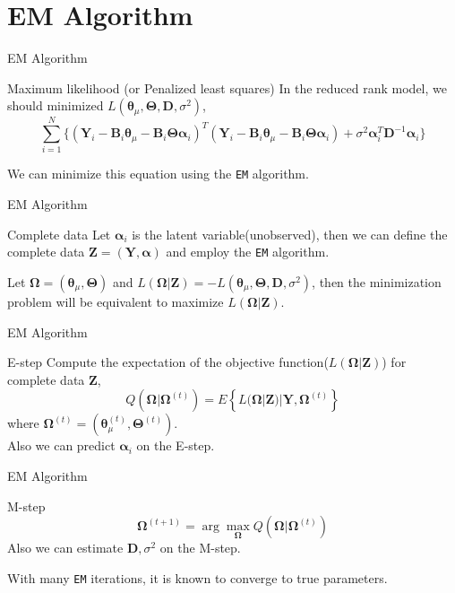 \documentclass{beamer}
\def \bY {\mathbf{Y}}
\def \bD {\mathbf{D}}
\def \btheta {\boldsymbol{\theta}}
\def \bTheta {\boldsymbol{\Theta}}
\def \balpha {\boldsymbol{\alpha}}
\begin{document}
\section{EM Algorithm}
\begin{frame}{EM Algorithm}
	\begin{block}{Maximum likelihood (or Penalized least squares)}
		\vspace{0.5cm}
		In the reduced rank model, we should minimized $L(\btheta_{\mu}, \bTheta, \mathbf{D}, \sigma^2)$,
		$$
		\sum_{i=1}^N \bigg \{ (\bY_i-\mathbf{B}_i\btheta_{\mu}-\mathbf{B}_i\bTheta\balpha_i)^T(\bY_i-\mathbf{B}_i\btheta_{\mu}-\mathbf{B}_i\bTheta\balpha_i) + \sigma^2 \balpha_i^T \bD^{-1}\balpha_i \bigg \}
		$$
	\end{block}
	We can minimize this equation using the \texttt{EM} algorithm.
\end{frame}

\begin{frame}{EM Algorithm}
	\begin{block}{Complete data}
		\vspace{0.2cm}
		Let $\balpha_i$ is the latent variable(unobserved), then we can define the complete data $ \mathbf{Z} = (\bY, \balpha)$ and employ the \texttt{EM} algorithm.
	\end{block}
	\vspace{1cm}
	Let $\mathbf\Omega = (\btheta_{\mu}, \bTheta)$ and $L(\mathbf\Omega|\mathbf{Z}) = -L(\btheta_{\mu}, \bTheta, \mathbf{D}, \sigma^2)$, then the minimization problem will be equivalent to maximize $L(\mathbf\Omega|\mathbf{Z})$.
\end{frame}

\begin{frame}{EM Algorithm}
	\begin{block}{E-step}
		\vspace{0.1cm}
		Compute the expectation of the objective function($L(\mathbf\Omega|\mathbf{Z})$) for complete data $\mathbf{Z}$,
		$$
		Q(\mathbf\Omega|\mathbf\Omega^{(t)}) = E\left\{ L(\mathbf\Omega|\mathbf{Z})|\bY,\mathbf\Omega^{(t)} \right\}
		$$
		where $\mathbf\Omega^{(t)} = (\btheta_{\mu}^{(t)}, \bTheta^{(t)})$.\\
		Also we can predict $\balpha_i$ on the E-step.
	\end{block}
\end{frame}

\begin{frame}{EM Algorithm}
	\begin{block}{M-step}
		\vspace{0.1cm}
		$$
		\mathbf\Omega^{(t+1)} = \arg\max_\mathbf\Omega Q(\mathbf\Omega|\mathbf\Omega^{(t)})
		$$
		Also we can estimate $\mathbf{D}, \sigma^2$ on the M-step.
	\end{block}
	\vspace{0.5cm}
	With many \texttt{EM} iterations, it is known to converge to true parameters.
\end{frame}
\end{document}
